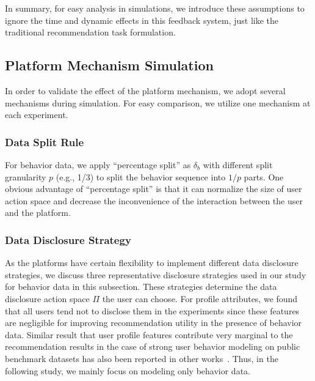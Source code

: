 In summary, for easy analysis in simulations, we introduce these assumptions to ignore the time and dynamic effects in this feedback system, just like the traditional recommendation task formulation.
























\subsection{Platform Mechanism Simulation}
\label{sec:plat_mech}
In order to validate the effect of the platform mechanism, we adopt several mechanisms during simulation. 
For easy comparison, we utilize one mechanism at each experiment. %


\subsubsection{\textbf{Data Split Rule}}

For behavior data, we apply ``percentage split'' as $\delta_b$ with different split granularity $p$ (e.g., 1/3) to split the behavior sequence into $1/p$ parts. 
One obvious advantage of ``percentage split'' is that it can normalize the size of user action space and decrease the inconvenience of the interaction between the user and the platform.

\subsubsection{\textbf{Data Disclosure Strategy}}
\label{sec:data_disclose_choice}

As the platforms have certain flexibility to implement different data disclosure strategies, we discuss three representative disclosure strategies used in our study for behavior data in this subsection.
These strategies determine the data disclosure action space $\Pi$ the user can choose.
For profile attributes, we found that all users tend not to disclose them in the experiments since these features are negligible for improving recommendation utility in the presence of behavior data.
Similar result that user profile features contribute very marginal to the recommendation results in the case of strong user behavior modeling on public benchmark datasets has also been reported in other works~\cite{kang2018self,Sun:cikm19:BERT4Rec}.
Thus, in the following study, we mainly focus on modeling only  behavior data.

